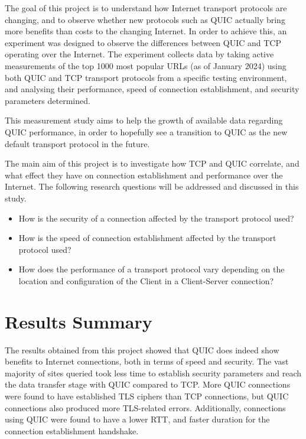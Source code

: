 \documentclass{l4proj}
\begin{document}
The goal of this project is to understand how Internet transport protocols are changing, and to observe whether new protocols such as QUIC actually bring more benefits than costs to the changing Internet. In order to achieve this, an experiment was designed to observe the differences between QUIC and TCP operating over the Internet. The experiment collects data by taking active measurements of the top 1000 most popular URLs (as of January 2024) using both QUIC and TCP transport protocols from a specific testing environment, and analysing their performance, speed of connection establishment, and security parameters determined.

This measurement study aims to help the growth of available data regarding QUIC performance, in order to hopefully see a transition to QUIC as the new default transport protocol in the future. 

The main aim of this project is to investigate how TCP and QUIC correlate, and what effect they have on connection establishment and performance over the Internet. The following research questions will be addressed and discussed in this study.

\begin{itemize}
    \item {How is the security of a connection affected by the transport protocol used?}
    \item {How is the speed of connection establishment affected by the transport protocol used?}
    \item {How does the performance of a transport protocol vary depending on the location and configuration of the Client in a Client-Server connection?}
\end{itemize}


\section{Results Summary}

The results obtained from this project showed that QUIC does indeed show benefits to Internet connections, both in terms of speed and security. The vast majority of sites queried took less time to establish security parameters and reach the data transfer stage with QUIC compared to TCP. More QUIC connections were found to have established TLS ciphers than TCP connections, but QUIC connections also produced more TLS-related errors. Additionally, connections using QUIC were found to have a lower RTT, and faster duration for the connection establishment handshake.
\end{document}
